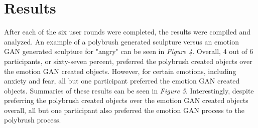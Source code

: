 \documentclass{sigchi}
\begin{document}
\section{Results}

After each of the six user rounds were completed, the results were compiled and analyzed. An example of a polybrush generated sculpture versus an emotion GAN generated sculpture for "angry" can be seen in \emph {Figure 4}. Overall, 4 out of 6 participants, or sixty-seven percent, preferred the polybrush created objects over the emotion GAN created objects. However, for certain emotions, including anxiety and fear, all but one participant preferred the emotion GAN created objects. Summaries of these results can be seen in \emph {Figure 5}. Interestingly, despite preferring the polybrush created objects over the emotion GAN created objects overall, all but one participant also preferred the emotion GAN process to the polybrush process. 
\end{document}

